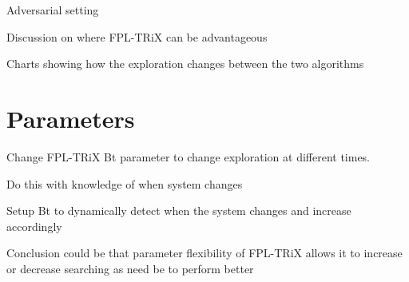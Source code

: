 Adversarial setting

Discussion on where FPL-TRiX can be advantageous

Charts showing how the exploration changes between the two algorithms


\pagebreak


\section{Parameters}

Change FPL-TRiX Bt parameter to change exploration at different times.

Do this with knowledge of when system changes

Setup Bt to dynamically detect when the system changes and increase accordingly


Conclusion could be that parameter flexibility of FPL-TRiX allows it to increase or decrease searching as need be to perform better

\pagebreak


\appendix %



%
%





